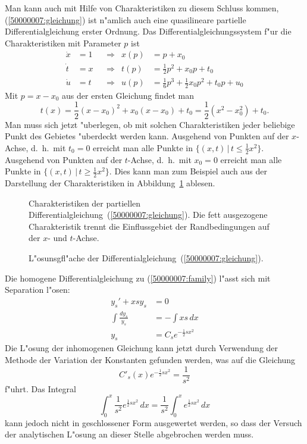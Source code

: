 \begin{loesung}
\begin{teilaufgaben}
Man kann auch mit Hilfe von Charakteristiken zu diesem Schluss kommen, 
(\ref{50000007:gleichung}) ist n"amlich auch eine quasilineare partielle
Differentialgleichung erster Ordnung.
Das Differentialgleichungssystem f"ur die Charakteristiken mit Parameter $p$
ist
\begin{align*}
\dot x&=1&&\Rightarrow&x(p)&=p+x_0\\
\dot t&=x&&\Rightarrow&t(p)&=\frac12p^2+x_0p+t_0\\
\dot u&=t&&\Rightarrow&u(p)&=\frac16p^3+\frac12x_0p^2+t_0p+u_0
\end{align*}
Mit $p=x-x_0$ aus der ersten Gleichung findet man
\[
t(x)=\frac12(x-x_0)^2+x_0(x-x_0)+t_0=\frac12(x^2-x_0^2)+t_0.
\]
Man muss sich jetzt "uberlegen, ob mit solchen Charakteristiken
jeder beliebige Punkt des Gebietes "uberdeckt werden kann.
Ausgehend von Punkten auf der $x$-Achse, d.~h.~mit $t_0=0$
erreicht man alle Punkte in $\{(x,t)\,|\, t\le \frac12x^2\}$.
Ausgehend von Punkten auf der $t$-Achse, d.~h.~mit $x_0=0$
erreicht man alle Punkte in $\{(x,t)\,|\, t\ge \frac12x^2\}$.
Dies kann man zum Beispiel auch aus der Darstellung
der Charakteristiken in Abbildung~\ref{50000007:bild}
ablesen.
\begin{figure}
\begin{center}
\end{center}
\caption{Charakteristiken der partiellen
Differentialgleichung~(\ref{50000007:gleichung}).
Die fett ausgezogene Charakteristik trennt die Einflussgebiet der
Randbedingungen auf der $x$- und $t$-Achse.
\label{50000007:bild}}
\end{figure}
\begin{figure}
\centering
{}
\caption{L"osunsgfl"ache der Differentialgleichung~(\ref{50000007:gleichung}).
\label{50000007:loesungsflaeche}}
\end{figure}
\item
Die homogene Differentialgleichung zu (\ref{50000007:family}) l"asst sich
mit Separation l"osen:
\begin{align*}
y_s'  + xsy_s&=0
\\
\int\frac{dy_s}{y_s}&=-\int xs\,dx
\\
y_s&=C_se^{-\frac12sx^2}
\end{align*}
Die L"osung der inhomogenen Gleichung kann jetzt durch Verwendung der
Methode der Variation der Konstanten gefunden werden, was auf die
Gleichung 
\[
C'_s(x)e^{-\frac12sx^2}=\frac1{s^2}
\]
f"uhrt.
Das Integral 
\[
\int_0^x\frac1{s^2}e^{\frac12sx^2}\,dx
=\frac1{s^2}
\int_0^xe^{\frac12sx^2}\,dx
\]
kann jedoch nicht in geschlossener Form ausgewertet werden, so dass der
Versuch der analytischen L"osung an dieser Stelle abgebrochen werden muss.
\end{teilaufgaben}
\end{loesung}

